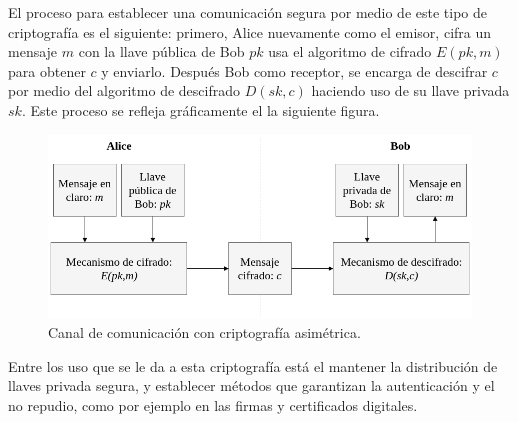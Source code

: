     El proceso para establecer una comunicación segura por medio de este tipo
    de criptografía es el siguiente: primero, Alice nuevamente como el emisor,
    cifra un mensaje $m$ con la llave pública de Bob $pk$ usa el algoritmo de 
    cifrado $E(pk,m)$ para obtener $c$ y enviarlo. Después Bob como receptor, 
    se encarga de descifrar $c$ por medio del algoritmo de descifrado 
    $D(sk,c)$ haciendo uso de su llave privada $sk$. Este proceso se refleja 
    gráficamente el la siguiente figura.

    \begin{figure}[H]
      \begin{center}
        \includegraphics[width=0.8\linewidth]
          {contenidos/antecedentes/intro_img/cripto_asimetrica.png}
        \caption{Canal de comunicación con criptografía asimétrica.}
      \end{center}
    \end{figure}

    Entre los uso que se le da a esta criptografía está el mantener la
    distribución de llaves privada segura, y establecer métodos que garantizan
    la autenticación y el no repudio, como por ejemplo en las firmas y
    certificados digitales.

